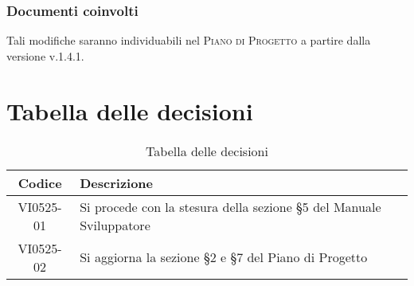 \documentclass{article}
\begin{document}
\subsubsection*{Documenti coinvolti}
Tali modifiche saranno individuabili nel \textsc{Piano di Progetto} a partire dalla versione v.1.4.1.


\section{Tabella delle decisioni}%
\label{sub:decisioni}

\begin{table}[!ht]
	\centering
	\begin{tabular}{|c|p{13cm}|}
		\hline
		\rowcolor{lightgray}
		\textbf{Codice} & \textbf{Descrizione} \\ 
		\hline
			VI0525-01 & Si procede con la stesura della sezione \S5 del Manuale Sviluppatore \\
            VI0525-02 & Si aggiorna la sezione \S2 e \S7 del Piano di Progetto \\
		\hline
	\end{tabular}
	\caption{Tabella delle decisioni}
\end{table}
\end{document}
